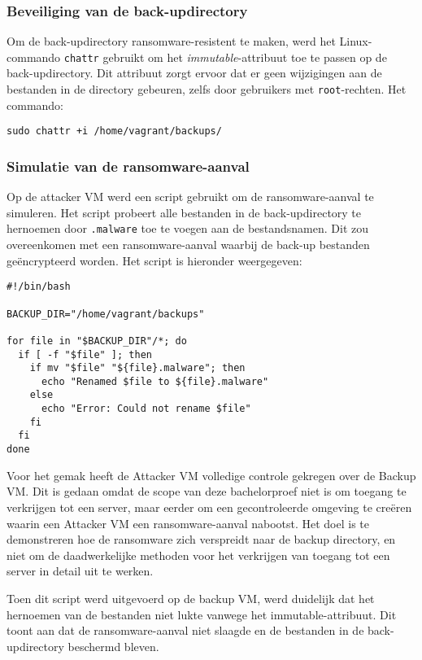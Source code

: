 \subsubsection{Beveiliging van de back-updirectory}
Om de back-updirectory ransomware-resistent te maken, werd het Linux-commando \texttt{chattr} gebruikt om het \textit{immutable}-attribuut toe te passen op de back-updirectory. Dit attribuut zorgt ervoor dat er geen wijzigingen aan de bestanden in de directory gebeuren, zelfs door gebruikers met \texttt{root}-rechten. Het commando:
\begin{verbatim}
sudo chattr +i /home/vagrant/backups/
\end{verbatim}

\subsubsection{Simulatie van de ransomware-aanval}
Op de attacker VM werd een script gebruikt om de ransomware-aanval te simuleren. Het script probeert alle bestanden in de back-updirectory te hernoemen door \texttt{.malware} toe te voegen aan de bestandsnamen. Dit zou overeenkomen met een ransomware-aanval waarbij de back-up bestanden geëncrypteerd worden. Het script is hieronder weergegeven:
\begin{verbatim}
#!/bin/bash
    
BACKUP_DIR="/home/vagrant/backups"
    
for file in "$BACKUP_DIR"/*; do
  if [ -f "$file" ]; then
    if mv "$file" "${file}.malware"; then
      echo "Renamed $file to ${file}.malware"
    else      
      echo "Error: Could not rename $file"    
    fi    
  fi    
done    
\end{verbatim}
Voor het gemak heeft de Attacker VM volledige controle gekregen over de Backup VM. Dit is gedaan omdat de scope van deze bachelorproef niet is om toegang te verkrijgen tot een server, maar eerder om een gecontroleerde omgeving te creëren waarin een Attacker VM een ransomware-aanval nabootst. Het doel is te demonstreren hoe de ransomware zich verspreidt naar de backup directory, en niet om de daadwerkelijke methoden voor het verkrijgen van toegang tot een server in detail uit te werken.

Toen dit script werd uitgevoerd op de backup VM, werd duidelijk dat het hernoemen van de bestanden niet lukte vanwege het immutable-attribuut. Dit toont aan dat de ransomware-aanval niet slaagde en de bestanden in de back-updirectory beschermd bleven.

